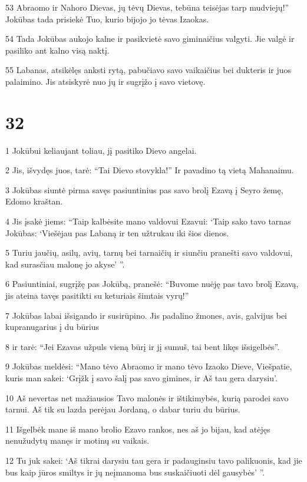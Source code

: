 \par 53 Abraomo ir Nahoro Dievas, jų tėvų Dievas, tebūna teisėjas tarp mudviejų!” Jokūbas tada prisiekė Tuo, kurio bijojo jo tėvas Izaokas. 
\par 54 Tada Jokūbas aukojo kalne ir pasikvietė savo giminaičius valgyti. Jie valgė ir pasiliko ant kalno visą naktį. 
\par 55 Labanas, atsikėlęs anksti rytą, pabučiavo savo vaikaičius bei dukteris ir juos palaimino. Jis atsiskyrė nuo jų ir sugrįžo į savo vietovę.



\chapter{32}


\par 1 Jokūbui keliaujant toliau, jį pasitiko Dievo angelai. 
\par 2 Jis, išvydęs juos, tarė: “Tai Dievo stovykla!” Ir pavadino tą vietą Mahanaimu. 
\par 3 Jokūbas siuntė pirma savęs pasiuntinius pas savo brolį Ezavą į Seyro žemę, Edomo kraštan. 
\par 4 Jis įsakė jiems: “Taip kalbėsite mano valdovui Ezavui: ‘Taip sako tavo tarnas Jokūbas: ‘Viešėjau pas Labaną ir ten užtrukau iki šios dienos. 
\par 5 Turiu jaučių, asilų, avių, tarnų bei tarnaičių ir siunčiu pranešti savo valdovui, kad surasčiau malonę jo akyse’ ”. 
\par 6 Pasiuntiniai, sugrįžę pas Jokūbą, pranešė: “Buvome nuėję pas tavo brolį Ezavą, jis ateina tavęs pasitikti su keturiais šimtais vyrų!” 
\par 7 Jokūbas labai išsigando ir susirūpino. Jis padalino žmones, avis, galvijus bei kupranugarius į du būrius 
\par 8 ir tarė: “Jei Ezavas užpuls vieną būrį ir jį sumuš, tai bent likęs išsigelbės”. 
\par 9 Jokūbas meldėsi: “Mano tėvo Abraomo ir mano tėvo Izaoko Dieve, Viešpatie, kuris man sakei: ‘Grįžk į savo šalį pas savo gimines, ir Aš tau gera darysiu’. 
\par 10 Aš nevertas net mažiausios Tavo malonės ir ištikimybės, kurią parodei savo tarnui. Aš tik su lazda perėjau Jordaną, o dabar turiu du būrius. 
\par 11 Išgelbėk mane iš mano brolio Ezavo rankos, nes aš jo bijau, kad atėjęs nenužudytų manęs ir motinų su vaikais. 
\par 12 Tu juk sakei: ‘Aš tikrai darysiu tau gera ir padauginsiu tavo palikuonis, kad jie bus kaip jūros smiltys ir jų neįmanoma bus suskaičiuoti dėl gausybės’ ”. 
